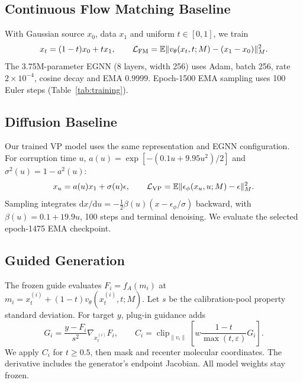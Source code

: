 \documentclass{article}
\begin{document}
\subsection{Continuous Flow Matching Baseline}\label{sec:fm}
With Gaussian source $x_0$, data $x_1$ and uniform $t\in[0,1]$, we train
\begin{equation}
x_t=(1-t)x_0+tx_1,\qquad \mathcal L_{\rm FM}=\mathbb E\|v_\theta(x_t,t;M)-(x_1-x_0)\|_M^2.
\label{eq:fm}
\end{equation}
The 3.75M-parameter EGNN (8 layers, width 256) uses Adam, batch 256, rate $2\times10^{-4}$, cosine decay and EMA 0.9999. Epoch-1500 EMA sampling uses 100 Euler steps (Table~\ref{tab:training}).

\subsection{Diffusion Baseline}\label{sec:diff}
Our trained VP model uses the same representation and EGNN configuration. For corruption time $u$, $a(u)=\exp[-(0.1u+9.95u^2)/2]$ and $\sigma^2(u)=1-a^2(u)$:
\begin{equation}
x_u=a(u)x_1+\sigma(u)\epsilon,\qquad\mathcal L_{\rm VP}=\mathbb E\|\epsilon_\phi(x_u,u;M)-\epsilon\|_M^2.
\label{eq:vp}
\end{equation}
Sampling integrates $\mathrm dx/\mathrm du=-\frac12\beta(u)(x-\epsilon_\phi/\sigma)$ backward, with $\beta(u)=0.1+19.9u$, 100 steps and terminal denoising. We evaluate the selected epoch-1475 EMA checkpoint.

\subsection{Guided Generation}\label{sec:guidance}
The frozen guide evaluates $F_i=f_A(m_i)$ at $m_i=x_t^{(i)}+(1-t)v_\theta(x_t^{(i)},t;M)$. Let $s$ be the calibration-pool property standard deviation. For target $y$, plug-in guidance adds
\begin{equation}
G_i=\frac{y-F_i}{s^2}\nabla_{x_t^{(i)}}F_i,\qquad
C_i=\operatorname{clip}_{\|v_i\|}\!\left[w\frac{1-t}{\max(t,\varepsilon)}G_i\right].
\label{eq:plug}
\end{equation}
We apply $C_i$ for $t\ge0.5$, then mask and recenter molecular coordinates. The derivative includes the generator's endpoint Jacobian. All model weights stay frozen.
\end{document}
